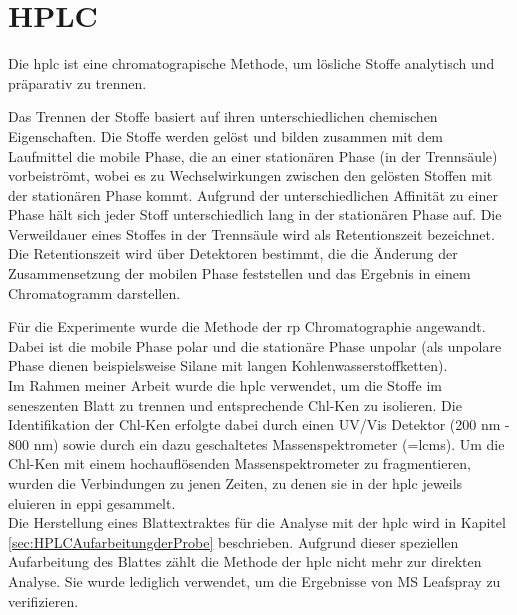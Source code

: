 \section{HPLC}

Die \gls{hplc} ist eine chromatograpische Methode, um lösliche Stoffe analytisch und präparativ zu trennen. \cite[S. 165]{Chromatographie} 

Das Trennen der Stoffe basiert auf ihren unterschiedlichen chemischen Eigenschaften. Die Stoffe werden gelöst und bilden zusammen mit dem Laufmittel die mobile Phase, die an einer stationären Phase (in der Trennsäule) vorbeiströmt, wobei es zu Wechselwirkungen zwischen den gelösten Stoffen mit der stationären Phase kommt. Aufgrund der unterschiedlichen Affinität zu einer Phase hält sich jeder Stoff unterschiedlich lang in der stationären Phase auf. Die Verweildauer eines Stoffes in der Trennsäule wird als Retentionszeit bezeichnet. \cite[S. 31-32]{Chromatographie} Die Retentionszeit wird über Detektoren bestimmt, die die Änderung der Zusammensetzung der mobilen Phase feststellen und das Ergebnis in einem Chromatogramm darstellen. \cite[S. 46]{Chromatographie} 

Für die Experimente wurde die Methode der \gls{rp} Chromatographie angewandt. Dabei ist die mobile Phase polar und die stationäre Phase unpolar (als unpolare Phase dienen beispielsweise Silane mit langen Kohlenwasserstoffketten). \cite[S. 189]{Chromatographie}\\

Im Rahmen meiner Arbeit wurde die \gls{hplc} verwendet, um die Stoffe im seneszenten Blatt zu trennen und entsprechende \gls{Chl-K}en zu isolieren. Die Identifikation der \gls{Chl-K}en erfolgte dabei durch einen UV/Vis Detektor (200 nm - 800 nm) sowie durch ein dazu geschaltetes Massenspektrometer (=\gls{lcms}). Um die \gls{Chl-K}en mit einem hochauflösenden Massenspektrometer zu fragmentieren, wurden die Verbindungen zu jenen Zeiten, zu denen sie in der \gls{hplc} jeweils eluieren in \gls{eppi} gesammelt.\\

Die Herstellung eines Blattextraktes für die Analyse mit der \gls{hplc} wird in Kapitel \ref{sec:HPLCAufarbeitungderProbe} beschrieben. Aufgrund dieser speziellen Aufarbeitung des Blattes zählt die Methode der \gls{hplc} nicht mehr zur direkten Analyse. Sie wurde lediglich verwendet, um die Ergebnisse von MS Leafspray zu verifizieren.
